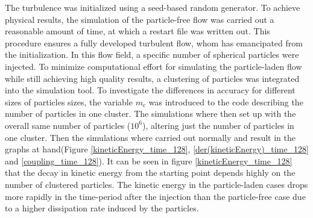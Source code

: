\documentclass[11pt,a4paper,openany,oneside,parskip=half*]{article}
\begin{document}
The turbulence was initialized using a seed-based random generator. To achieve physical results, the simulation of the particle-free flow was carried out a reasonable amount of time, 
at which a restart file was written out. This procedure ensures a fully developed turbulent 
flow, whom has emancipated from the initialization. In this flow field, a specific number of spherical particles were injected. 
\newline
To minimize computational effort for simulating the particle-laden flow while still achieving high quality results, a clustering of particles was integrated into the simulation tool. To investigate the differences in accuracy for different sizes of particles sizes, the variable $m_\mathrm{c}$ was introduced to the code describing the number of particles in one cluster. The simulations where then set up with the overall same number of particles ($ 10^6 $), altering just the number of particles in one cluster. Then the simulations where carried out normally and result in the graphs  at hand(Figure \ref{kineticEnergy_time_128}, \ref{der(kineticEnergy)_time_128} and \ref{coupling_time_128}). 
It can be seen in figure \ref{kineticEnergy_time_128} that the decay in kinetic energy from the starting point depends highly on the number of clustered particles. The kinetic energy in the particle-laden cases drops more rapidly in the time-period after the injection than the particle-free case due to a higher dissipation rate induced by the particles. 
\end{document}
